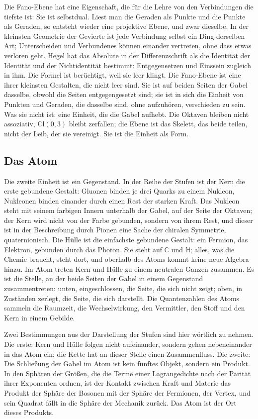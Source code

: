 \documentclass[11pt,a4paper]{article}
\newcommand{\Randlesart}{\marginpar{\raggedright\footnotesize\textcolor{lesart}{$\bigcirc$\,Lesart}}}
\newcommand{\C}{\mathbb C}
\newcommand{\HH}{\mathbb H}
\newcommand{\Cl}{\mathrm{Cl}}
\begin{document}
\Randlesart Die Fano-Ebene hat eine Eigenschaft, die für die Lehre von den Verbindungen die tiefste ist: Sie ist selbstdual. Liest man die Geraden als Punkte und die Punkte als Geraden, so entsteht wieder eine projektive Ebene, und zwar dieselbe. In der kleinsten Geometrie der Gevierte ist jede Verbindung selbst ein Ding derselben Art; Unterscheiden und Verbundenes können einander vertreten, ohne dass etwas verloren geht. Hegel hat das Absolute in der Differenzschrift als die Identität der Identität und der Nichtidentität bestimmt: Entgegensetzen und Einssein zugleich in ihm. Die Formel ist berüchtigt, weil sie leer klingt. Die Fano-Ebene ist eine ihrer kleinsten Gestalten, die nicht leer sind. Sie ist auf beiden Seiten der Gabel dasselbe, obwohl die Seiten entgegengesetzt sind; sie ist in sich die Einheit von Punkten und Geraden, die dasselbe sind, ohne aufzuhören, verschieden zu sein. Was sie nicht ist: eine Einheit, die die Gabel aufhebt. Die Oktaven bleiben nicht assoziativ, $\Cl(0,3)$ bleibt zerfallen; die Ebene ist das Skelett, das beide teilen, nicht der Leib, der sie vereinigt. Sie ist die Einheit als Form.

\subsection{Das Atom}

Die zweite Einheit ist ein Gegenstand. In der Reihe der Stufen ist der Kern die erste gebundene Gestalt: Gluonen binden je drei Quarks zu einem Nukleon, Nukleonen binden einander durch einen Rest der starken Kraft. Das Nukleon steht mit seinem farbigen Innern unterhalb der Gabel, auf der Seite der Oktaven; der Kern wird nicht von der Farbe gebunden, sondern von ihrem Rest, und dieser ist in der Beschreibung durch Pionen eine Sache der chiralen Symmetrie, quaternionisch. Die Hülle ist die einfachste gebundene Gestalt: ein Fermion, das Elektron, gebunden durch das Photon. Sie steht auf $\C$ und $\HH$; alles, was die Chemie braucht, steht dort, und oberhalb des Atoms kommt keine neue Algebra hinzu. Im Atom treten Kern und Hülle zu einem neutralen Ganzen zusammen. Es ist die Stelle, an der beide Seiten der Gabel in einem Gegenstand zusammentreten: unten, eingeschlossen, die Seite, die sich nicht zeigt; oben, in Zuständen zerlegt, die Seite, die sich darstellt. Die Quantenzahlen des Atoms sammeln die Raumzeit, die Wechselwirkung, den Vermittler, den Stoff und den Kern in einem Gebilde.

Zwei Bestimmungen aus der Darstellung der Stufen sind hier wörtlich zu nehmen. Die erste: Kern und Hülle folgen nicht aufeinander, sondern gehen nebeneinander in das Atom ein; die Kette hat an dieser Stelle einen Zusammenfluss. Die zweite: Die Schließung der Gabel im Atom ist kein fünftes Objekt, sondern ein Produkt. In den Sphären der Größen, die die Terme einer Lagrangedichte nach der Parität ihrer Exponenten ordnen, ist der Kontakt zwischen Kraft und Materie das Produkt der Sphäre der Bosonen mit der Sphäre der Fermionen, der Vertex, und sein Quadrat fällt in die Sphäre der Mechanik zurück. Das Atom ist der Ort dieses Produkts.
\end{document}
